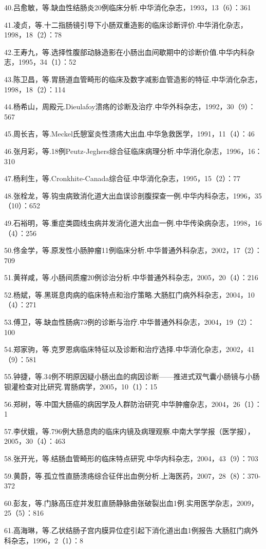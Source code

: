 40.吕愈敏，等.缺血性结肠炎20例临床分析.中华消化杂志，1993，13（6）：361

41.凌贞，等.十二指肠镜引导下小肠双重造影的临床诊断评价.中华消化杂志，1998，18（2）：78

42.王寿九，等.选择性腹部动脉造影在小肠出血间歇期中的诊断价值.中华内科杂志，1995，34（1）：52

43.陈卫昌，等.胃肠道血管畸形的临床及数字减影血管造影的特征.中华消化杂志，1998，18（2）：114

44.杨希山，周殿元.Dieulafoy溃疡的诊断及治疗.中华外科杂志，1992，30（9）：567

45.周长吉，等.Meckel氏憩室炎性溃疡大出血.中华急救医学，1991，11（4）：46

46.张月彩，等.18例Peutz-Jeghers综合征临床病理分析.中华消化杂志，1996，16：310

47.杨利生，等.Cronkhite-Canada综合征.中华消化杂志，1995，15（2）：77

48.张栓龙，等.钩虫病致消化道大出血误诊剖腹探查一例.中华内科杂志，1996，35（10）：652

49.石裕明，等.重症类圆线虫病并发消化道大出血一例.中华传染病杂志，1998，16（4）：256

50.佟金学，等.原发性小肠肿瘤11例临床分析.中华普通外科杂志，2002，17（2）：709

51.黄祥咸，等.小肠间质瘤20例诊治分析.中华普通外科杂志，2005，20（4）：216

52.杨斌，等.黑斑息肉病的临床特点和治疗策略.大肠肛门病外科杂志，2004，10（4）：271

53.傅卫，等.缺血性肠病73例的诊断与治疗.中华普通外科杂志，2004，19（2）：100

54.郑家驹，等.克罗恩病临床特征以及诊断和治疗选择.中华消化杂志，2002，41（9）：581

55.钟捷，等.34例不明原因疑小肠出血的病因诊断------推进式双气囊小肠镜与小肠钡灌检查对比研究.胃肠病学，2005，10（1）：15

56.郑树，等.中国大肠癌的病因学及人群防治研究.中华肿瘤杂志，2004，26（1）：1

57.李伏娥，等.796例大肠息肉的临床内镜及病理观察.中南大学学报（医学报），2005，30（4）：463

58.张开光，等.结肠血管畸形的临床特点研究.中华内科杂志，2004，43（9）：703

59.黄蔚，等.孤立性直肠溃疡综合征伴出血例分析.上海医药，2007，28（8）：370-372

60.彭友，等.门脉高压症并发肛直肠静脉曲张破裂出血1例.实用医学杂志，2009，25（5）：816

61.高海琳，等.乙状结肠子宫内膜异位症引起下消化道出血1例报告.大肠肛门病外科杂志，1996，2（1）：8


